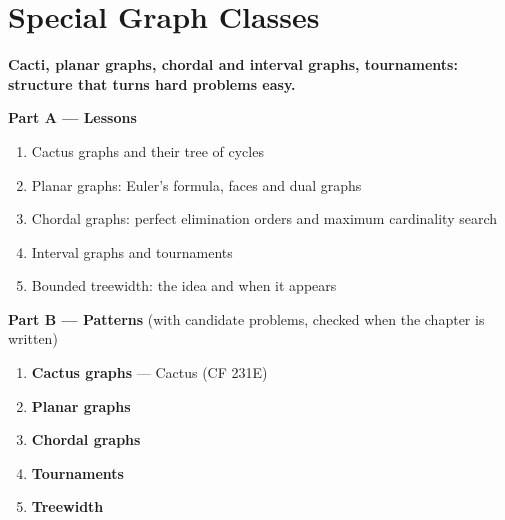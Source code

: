 \chapter{Special Graph Classes}
\label{ch:special_classes}

\begin{tcolorbox}[enhanced, colback=white, colframe=secondaryblue, boxrule=1pt, arc=2mm]
\textbf{\large\textcolor{primaryblue}{Cacti, planar graphs, chordal and interval graphs, tournaments: structure that turns hard problems easy.}}
\end{tcolorbox}


\begin{plannedbox}
\textbf{Part A --- Lessons}
\begin{enumerate}[leftmargin=*, label=\textbf{A\arabic*.}, itemsep=1pt]
    \item Cactus graphs and their tree of cycles
    \item Planar graphs: Euler's formula, faces and dual graphs
    \item Chordal graphs: perfect elimination orders and maximum cardinality search
    \item Interval graphs and tournaments
    \item Bounded treewidth: the idea and when it appears
\end{enumerate}
\textbf{Part B --- Patterns} (with candidate problems, checked when the chapter is written)
\begin{enumerate}[leftmargin=*, label=\textbf{P\arabic*.}, itemsep=1pt]
    \item \textbf{Cactus graphs} --- Cactus {\small\color{darkgray}(CF 231E)}
    \item \textbf{Planar graphs}
    \item \textbf{Chordal graphs}
    \item \textbf{Tournaments}
    \item \textbf{Treewidth}
\end{enumerate}
\end{plannedbox}
